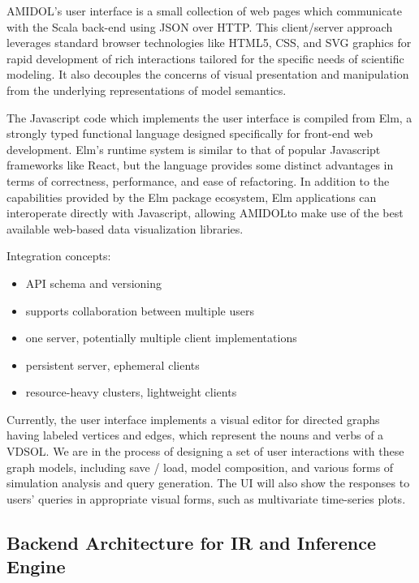\documentclass[11pt]{article}
\newcommand{\amidol}{\textsc{AMIDOL}}
\begin{document}
\amidol{}'s user interface is a small collection of web pages which communicate with the Scala back-end using JSON over HTTP.  This client/server approach leverages standard browser technologies like HTML5, CSS, and SVG graphics for rapid development of rich interactions tailored for the specific needs of scientific modeling. It also decouples the concerns of visual presentation and manipulation from the underlying representations of model semantics.

The Javascript code which implements the user interface is compiled from Elm, a strongly typed functional language designed specifically for front-end web development. Elm's runtime system is similar to that of popular Javascript frameworks like React, but the language provides some distinct advantages in terms of correctness, performance, and ease of refactoring. In addition to the capabilities provided by the Elm package ecosystem, Elm applications can interoperate directly with Javascript, allowing \amidol to make use of the best available web-based data visualization libraries.

Integration concepts:
\begin{itemize}
\item API schema and versioning
\item supports collaboration between multiple users
\item one server, potentially multiple client implementations
\item persistent server, ephemeral clients
\item resource-heavy clusters, lightweight clients
\end{itemize}

Currently, the user interface implements a visual editor for directed graphs having labeled vertices and edges, which represent the nouns and verbs of a VDSOL. We are in the process of designing a set of user interactions with these graph models, including save / load, model composition, and various forms of simulation analysis and query generation. The UI will also show the responses to users' queries in appropriate visual forms, such as multivariate time-series plots.

\subsection{Backend Architecture for IR and Inference Engine}
\end{document}
